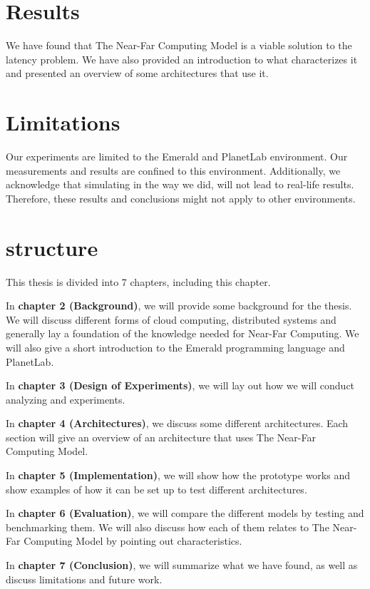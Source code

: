 \section{Results}
We have found that The Near-Far Computing Model is a viable solution to the latency problem. We have also provided an introduction to what characterizes it and presented an overview of some architectures that use it.

\section{Limitations}
Our experiments are limited to the Emerald and PlanetLab environment. Our measurements and results are confined to this environment. Additionally, we acknowledge that simulating in the way we did, will not lead to real-life results. Therefore, these results and conclusions might not apply to other environments.



\section{structure}
This thesis is divided into 7 chapters, including this chapter.

In \textbf{chapter 2 (Background)}, we will provide some background for the thesis. We will discuss different forms of cloud computing, distributed systems and generally lay a foundation of the knowledge needed for Near-Far Computing. We will also give a short introduction to the Emerald programming language and PlanetLab.

In \textbf{chapter 3 (Design of Experiments)}, we will lay out how we will conduct analyzing and experiments.

In \textbf{chapter 4 (Architectures)}, we discuss some different architectures. Each section will give an overview of an architecture that uses The Near-Far Computing Model.

In \textbf{chapter 5 (Implementation)}, we will show how the prototype works and show examples of how it can be set up to test different architectures.

In \textbf{chapter 6 (Evaluation)}, we will compare the different models by testing and benchmarking them. We will also discuss how each of them relates to The Near-Far Computing Model by pointing out characteristics.

In \textbf{chapter 7 (Conclusion)}, we will summarize what we have found, as well as discuss limitations and future work.


